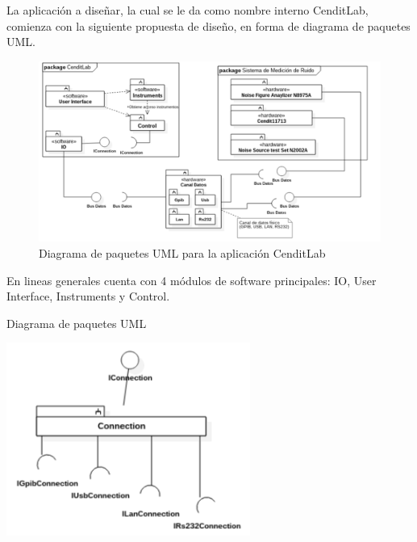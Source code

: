 \documentclass[paper=letter,oneside,fontsize=12pt, parskip=full]{article}
\begin{document}
	La aplicación a diseñar, la cual se le da como nombre interno CenditLab, comienza con la siguiente propuesta de diseño, en forma de diagrama de paquetes UML.
	
	\begin{figure}
		\centering 
		\includegraphics[width=\linewidth]{Imagenes/MainPackagesUml.pdf}
		\caption{Diagrama de paquetes UML para la aplicación CenditLab}
	\end{figure}
	
	En lineas generales cuenta con 4 módulos de software principales: IO, User Interface, Instruments y Control. 
	
	\begin{table}[h!]
		\centering
		\caption{Diagrama de paquetes UML}
		\includegraphics[width=8cm]{Imagenes/ConnectionPackageUml.pdf}
	\end{table}
	
\end{document}
